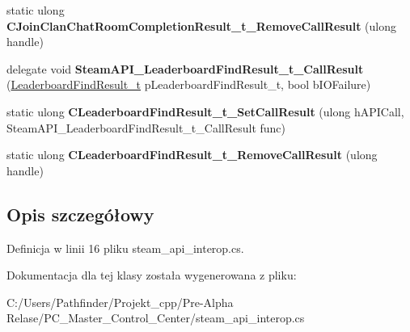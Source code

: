 \begin{DoxyCompactItemize}
\item 
\mbox{\label{class_valve_1_1_interop_1_1_native_entrypoints_acda8ad58da2f7513bc1b4f7a41b8bdcf}} 
static ulong {\bfseries C\+Join\+Clan\+Chat\+Room\+Completion\+Result\+\_\+t\+\_\+\+Remove\+Call\+Result} (ulong handle)
\item 
\mbox{\label{class_valve_1_1_interop_1_1_native_entrypoints_aa8d1db728fd3c834f3cc40cb83b48861}} 
delegate void {\bfseries Steam\+A\+P\+I\+\_\+\+Leaderboard\+Find\+Result\+\_\+t\+\_\+\+Call\+Result} (\hyperlink{struct_valve_1_1_steamworks_1_1_leaderboard_find_result__t}{Leaderboard\+Find\+Result\+\_\+t} p\+Leaderboard\+Find\+Result\+\_\+t, bool b\+I\+O\+Failure)
\item 
\mbox{\label{class_valve_1_1_interop_1_1_native_entrypoints_ab03de0ceae0f0641fe5f1bd26cad437a}} 
static ulong {\bfseries C\+Leaderboard\+Find\+Result\+\_\+t\+\_\+\+Set\+Call\+Result} (ulong h\+A\+P\+I\+Call, Steam\+A\+P\+I\+\_\+\+Leaderboard\+Find\+Result\+\_\+t\+\_\+\+Call\+Result func)
\item 
\mbox{\label{class_valve_1_1_interop_1_1_native_entrypoints_a42ef469ddc4c13fb87534bda3fbbb742}} 
static ulong {\bfseries C\+Leaderboard\+Find\+Result\+\_\+t\+\_\+\+Remove\+Call\+Result} (ulong handle)
\end{DoxyCompactItemize}


\subsection{Opis szczegółowy}


Definicja w linii 16 pliku steam\+\_\+api\+\_\+interop.\+cs.



Dokumentacja dla tej klasy została wygenerowana z pliku\+:\begin{DoxyCompactItemize}
\item 
C\+:/\+Users/\+Pathfinder/\+Projekt\+\_\+cpp/\+Pre-\/\+Alpha Relase/\+P\+C\+\_\+\+Master\+\_\+\+Control\+\_\+\+Center/steam\+\_\+api\+\_\+interop.\+cs\end{DoxyCompactItemize}
